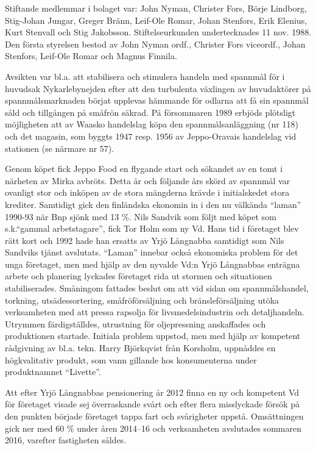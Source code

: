 {Stiftande medlemmar i bolaget var: John Nyman, Christer Fors, Börje Lindborg, Stig-Johan Jungar, Greger Bränn, Leif-Ole Romar, Johan Stenfors, Erik Elenius, Kurt Stenvall och Stig Jakobsson. Stiftelseurkunden undertecknades 11 nov. 1988. Den första styrelsen bestod av John Nyman ordf., Christer Fors viceordf., Johan Stenfors, Leif-Ole Romar och Magnus Finnila.

Avsikten var bl.a. att stabilisera och stimulera handeln med spannmål för i huvudsak Nykarlebynejden efter att den turbulenta växlingen av huvudaktörer på spannmålsmarknaden börjat upplevas hämmande för odlarna att få sin spannmål såld och tillgången på småfrön säkrad. På försommaren 1989 erbjöds plötsligt möjligheten att av Waasko handelslag köpa den spannmålsanläggning (nr 118) och det magasin, som byggts 1947 resp. 1956 av Jeppo-Oravais handelslag vid stationen (se närmare nr 57).


Genom köpet fick Jeppo Food en flygande start och sökandet av en tomt i närheten av Mirka avbröts. Detta år och följande års skörd av spannmål var ovanligt stor och inköpen av de stora mängderna krävde i initialskedet stora krediter. Samtidigt gick den finländska  ekonomin in i den nu välkända ``laman'' 1990-93 när Bnp sjönk med 13 \%.  Nils Sandvik som följt med köpet som s.k.``gammal arbetstagare'', fick Tor Holm som ny Vd. Hans tid i företaget blev rätt kort och 1992 hade han ersatts av Yrjö Långnabba samtidigt som Nils Sandviks tjänst avslutats. ``Laman'' innebar också ekonomiska problem för det unga företaget, men med hjälp av den nyvalde Vd:n Yrjö Långnabbas enträgna arbete och planering lyckades företaget rida ut stormen och situationen stabiliserades. Småningom fattades beslut om att vid sidan om spannmålshandel, torkning, utsädessortering, småfröförsäljning och bränsleförsäljning utöka verksamheten med att pressa rapsolja för livsmedelsindustrin och detaljhandeln. Utrymmen färdigställdes, utrustning för oljepressning anskaffades och produktionen startade. Initiala problem uppstod, men med hjälp av kompetent rådgivning av bl.a. tekn. Harry Björkqvist från Korsholm, uppnåddes en högkvalitativ produkt, som vann gillande hos konsumenterna under produktnamnet ``Livette''.

Att efter Yrjö Långnabbas pensionering år 2012 finna en ny och kompetent Vd för företaget visade sej överraskande svårt och efter flera misslyckade försök på den punkten började företaget tappa fart och svårigheter uppstå. Omsättningen gick ner med 60 \% under åren 2014--16 och verksamheten avslutades sommaren 2016, varefter fastigheten såldes.


}
